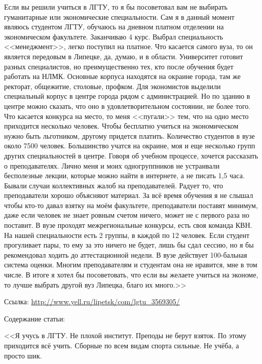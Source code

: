 \documentclass[a4paper,14pt,russian]{extreport}
\makeatletter
\renewcommand{\subsubsection}{\@startsection{subsubsection}{3}{\parindent}{3ex}{3ex}{\normalfont}}
\makeatother
\begin{document}
Если вы решили учиться в ЛГТУ, то я бы посоветовал вам не выбирать гуманитарные или экономические специальности. Сам я в данный момент являюсь студентом ЛГТУ, обучаюсь на дневном платном отделении на экономическом факультете. Заканчиваю 4 курс. Выбрал специальность <<менеджмент>>, легко поступил на платное. Что касается самого вуза, то он является передовым в Липецке, да, думаю, и в области. Университет готовит разных специалистов, но преимущественно тех, кто после обучения будет работать на НЛМК. Основные корпуса находятся на окраине города, там же ректорат, общежитие, столовые, профком. Для экономистов выделили специальный корпус в центре города рядом с администрацией. Но по зданию в центре можно сказать, что оно в удовлетворительном состоянии, не более того. Что касается конкурса на место, то меня <<пугали>> тем, что на одно место приходится несколько человек. Чтобы бесплатно учиться на экономическом нужно быть льготником, другому придется платить. Количество студентов в вузе около 7500 человек. Большинство учатся на окраине, моя и еще несколько групп других специальностей в центре. Говоря об учебном процессе, хочется рассказать о преподавателях. Лично меня и моих одногруппников не устраивали бесполезные лекции, которые можно найти в интернете, а не писать 1,5 часа. Бывали случаи коллективных жалоб на преподавателей. Радует то, что преподаватели хорошо объясняют материал. За всё время обучения я не слышал чтобы кто-то давал взятку на моём факультете, преподаватели поставят минимум, даже если человек не знает ровным счетом ничего, может не с первого раза но поставит. В вузе проходят межрегиональные конкурсы, есть своя команда КВН. На нашей специальности есть 2 группы, в каждой по 12 человек. Если студент прогуливает пары, то ему за это ничего не будет, лишь бы сдал сессию, но я бы рекомендовал ходить до аттестационной недели. В вузе действует 100-бальная система оценки. Многим преподавателям и студентам она не нравится, мне в том числе. В итоге я хотел бы посоветовать, что если вы желаете учиться на экономе, то лучше выбрать другой вуз Липецка, благо их много.>>

\subsubsection{Статья №2}

Ссылка: \url{http://www.yell.ru/lipetsk/com/lgtu_3569305/}

Содержание статьи:

<<Я учусь в ЛГТУ. Не плохой институт. Преподы не берут взяток. По этому приходится всё учить. Сборные по всем видам спорта сильные. Не учёба, а просто шик.
\end{document}
